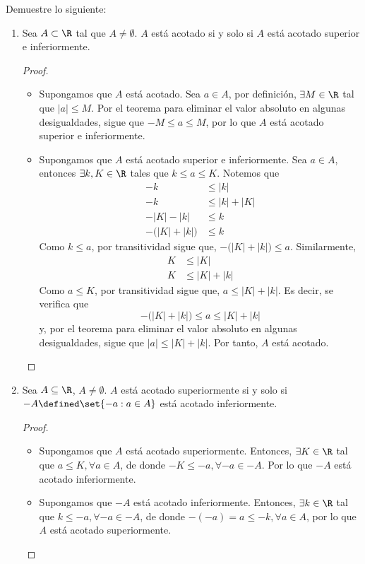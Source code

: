 Demuestre lo siguiente:

\begin{enumerate}[label=\alph*)]
  \item Sea $A\subset \R$ tal que $A\neq \emptyset$. $A$ está acotado si y solo si $A$ está acotado superior e inferiormente.
 
  \begin{proof} \leavevmode
   \begin{itemize}
    \item[$\Rightarrow)$] Supongamos que $A$ está acotado. Sea $a\in A$, por definición, $\exists M\in \R$ tal que $|a|\leq M$. Por el teorema para eliminar el valor absoluto en algunas desigualdades, sigue que $-M\leq a \leq M$, por lo que $A$ está acotado superior e inferiormente.
    \item[$\Leftarrow)$] Supongamos que $A$ está acotado superior e inferiormente. Sea $a\in A$, entonces $\exists k, K\in \R$ tales que $k\leq a \leq K$. Notemos que
    \begin{align*}
     -k &\leq |k|\\
     -k &\leq |k| + |K|\\
     -|K|-|k| &\leq k\\
     - \big(|K|+|k|\big) &\leq k
    \end{align*}
    Como $k\leq a$, por transitividad sigue que, $-\big(|K|+|k|\big) \leq a$. Similarmente,
    \begin{align*}
     K &\leq |K|\\
     K &\leq |K| + |k|
    \end{align*}
    Como $a\leq K$, por transitividad sigue que, $a\leq |K|+|k|$. Es decir, se verifica que \[-\big(|K|+|k|\big) \leq a \leq |K|+|k|\]
    y, por el teorema para eliminar el valor absoluto en algunas desigualdades, sigue que $|a| \leq |K| + |k|$. Por tanto, $A$ está acotado. \qedhere
   \end{itemize}
  \end{proof}
  
  \item Sea $A\subseteq\R$, $A\neq \emptyset$. $A$ está acotado superiormente si y solo si $-A\defined \set{-a: a\in A}$ está acotado inferiormente.
  
  \begin{proof}\leavevmode
  \begin{itemize}
  \item[$\Rightarrow)$] Supongamos que $A$ está acotado superiormente. Entonces, $\exists K\in \R$ tal que $a\leq K, \forall a\in A$, de donde $-K\leq -a, \forall -a\in -A$. Por lo que $-A$ está acotado inferiormente.
  \item[$\Leftarrow)$] Supongamos que $-A$ está acotado inferiormente. Entonces, $\exists k\in \R$ tal que $k\leq -a, \forall -a\in -A$, de donde $-(-a)=a\leq -k, \forall a\in A$, por lo que $A$ está acotado superiormente. \qedhere
  \end{itemize}
  \end{proof}
  

\end{enumerate}
